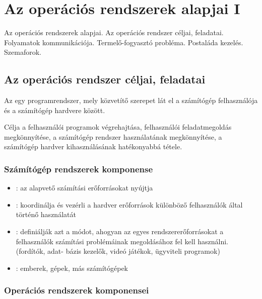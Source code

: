 \documentclass[../main.tex]{subfiles}
\begin{document}
\section{Az operációs rendszerek alapjai I}

\begin{fulltheorem}
  Az operációs rendszerek alapjai. Az operációs rendszer céljai, feladatai.
  Folyamatok kommunikációja. Termelő-fogyasztó probléma. Postaláda kezelés.
  Szemaforok.
\end{fulltheorem}

\subsection{Az operációs rendszer céljai, feladatai}

Az  egy programrendszer, mely közvetítő szerepet
lát el a számítógép felhasználója és a számítógép hardvere között.

Célja a felhasználói programok végrehajtása, felhasználói feladatmegoldás
megkönnyítése, a számítógép rendszer használatának megkönnyítése, a
számítógép hardver kihasználásának hatékonyabbá tétele.

\subsubsection*{Számítógép rendszerek komponense}

\begin{itemize}
  \item {}:
        az alapvető számítási erőforrásokat nyújtja
  \item {}:
        koordinálja és vezérli a hardver erőforrások különböző
        felhasználók által történő használatát
  \item {}:
        definiálják azt a módot, ahogyan az egyes rendszererőforrásokat
        a felhasználók számítási problémáinak megoldásához fel kell használni.
        (fordítók, adat- bázis kezelők, videó játékok, ügyviteli programok)
  \item {}:
        emberek, gépek, más számítógépek
\end{itemize}

\subsubsection*{Operációs rendszerek komponensei}
\end{document}
